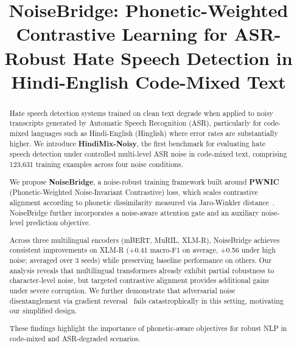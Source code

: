 \documentclass[conference]{IEEEtran}
\begin{document}
\title{NoiseBridge: Phonetic-Weighted Contrastive Learning for ASR-Robust Hate Speech Detection in Hindi-English Code-Mixed Text}

\author{

\and

}

\maketitle

\begin{abstract}
Hate speech detection systems trained on clean text degrade when applied to noisy transcripts generated by Automatic Speech Recognition (ASR), particularly for code-mixed languages such as Hindi-English (Hinglish) where error rates are substantially higher. We introduce \textbf{HindiMix-Noisy}, the first benchmark for evaluating hate speech detection under controlled multi-level ASR noise in code-mixed text, comprising 123,631 training examples across four noise conditions. 

We propose \textbf{NoiseBridge}, a noise-robust training framework built around \textbf{PWNIC} (Phonetic-Weighted Noise-Invariant Contrastive) loss, which scales contrastive alignment according to phonetic dissimilarity measured via Jaro-Winkler distance~\cite{winkler1990string}. NoiseBridge further incorporates a noise-aware attention gate and an auxiliary noise-level prediction objective.

Across three multilingual encoders (mBERT, MuRIL, XLM-R), NoiseBridge achieves consistent improvements on XLM-R (+0.41 macro-F1 on average, +0.56 under high noise; averaged over 3 seeds) while preserving baseline performance on others. Our analysis reveals that multilingual transformers already exhibit partial robustness to character-level noise, but targeted contrastive alignment provides additional gains under severe corruption. We further demonstrate that adversarial noise disentanglement via gradient reversal~\cite{ganin2016domain} fails catastrophically in this setting, motivating our simplified design.

These findings highlight the importance of phonetic-aware objectives for robust NLP in code-mixed and ASR-degraded scenarios.
\end{abstract}
\end{document}
